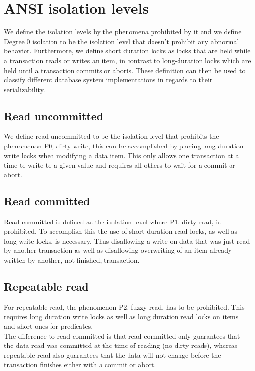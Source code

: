 \documentclass[sigconf, review=true]{acmart}
\begin{document}
\section{ANSI isolation levels}
We define the isolation levels by the phenomena prohibited by it and we define
Degree 0 isolation to be the isolation level that doesn’t prohibit any abnormal
behavior. Furthermore, we define short duration locks as locks that are held
while a transaction reads or writes an item, in contrast to long-duration locks which are
held until a transaction commits or aborts.
These definition can then be used to classify different database system implementations in
regards to their serializability.

\subsection{Read uncommitted}
We define read uncommitted to be the isolation level that prohibits the phenomenon
P0, dirty write, this can be accomplished by placing long-duration write locks when modifying a data item.
This only allows one transaction at a time to write to a given value and requires all others to wait for a commit or abort.

\subsection{Read committed}
Read committed is defined as the isolation level where P1, dirty read, is prohibited.
To accomplish this the use of short duration read locks, as well as long write locks, is
necessary. Thus disallowing a write on data that was just read by another transaction as
well as disallowing overwriting of an item already written by another, not finished, transaction.

\subsection{Repeatable read}
For repeatable read, the phenomenon P2, fuzzy read, has to be prohibited.
This requires long duration write locks as well as long duration read locks on
items and short ones for predicates.\\
The difference to read committed is that read committed only guarantees that
the data read was committed at the time of reading (no dirty reads), whereas
repeatable read also guarantees that the data will not change before the
transaction finishes either with a commit or abort.
\end{document}
